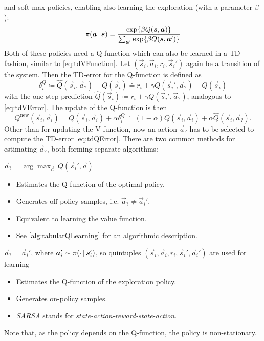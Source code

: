 		and soft-max policies, enabling also learning the exploration (with a parameter \(\beta\)):
		\begin{equation*}
			\pi(\bm{a} \,\vert\, \bm{s}) = \frac{\exp{ \beta Q(\bm{s}, \bm{a}) }}{\sum_{\bm{a}'} \exp{ \beta Q(\bm{s}, \bm{a}') }}
		\end{equation*}
		Both of these policies need a Q-function which can also be learned in a TD-fashion, similar to \eqref{eq:tdVFunction}. Let \( (\vec{s}_i, \vec{a}_i, r_i, \vec{s}_i') \) again be a transition of the system. Then the TD-error for the Q-function is defined as
		\begin{equation}
			\delta_i^Q \coloneqq \hat{Q}(\vec{s}_i, \vec{a}_?) - Q(\vec{s}_i) \doteq r_i + \gamma Q(\vec{s}_i', \vec{a}_?) - Q(\vec{s}_i)  \label{eq:tdQError}
		\end{equation}
		with the one-step prediction \( \hat{Q}(\vec{s}_i) \coloneqq r_i + \gamma Q(\vec{s}_i', \vec{a}_?) \), analogous to \eqref{eq:tdVError}. The update of the Q-function is then
		\begin{equation*}
			Q^\mathrm{new}(\vec{s}_i, \vec{a}_i) = Q(\vec{s}_i, \vec{a}_i) + \alpha \delta_i^Q \doteq (1 - \alpha) Q(\vec{s}_i, \vec{a}_i) + \alpha \hat{Q}(\vec{s}_i, \vec{a}_?).
		\end{equation*}
		Other than for updating the V-function, now an action \( \vec{a}_? \) has to be selected to compute the TD-error \eqref{eq:tdQError}. There are two common methods for estimating \(\vec{a}_?\), both forming separate algorithms:
		\begin{description}[leftmargin=3cm]
			\item[Q-Learning] \( \vec{a}_? = \arg\max_{\vec{a}} \, Q(\vec{s}_i', \vec{a}) \)
				\begin{itemize}
					\item Estimates the Q-function of the optimal policy.
					\item Generates off-policy samples, i.e. \( \vec{a}_? \neq \vec{a}_i' \).
					\item Equivalent to learning the value function.
					\item See \autoref{alg:tabularQLearning} for an algorithmic description.
				\end{itemize}
			\item[SARSA]      \( \vec{a}_? = \vec{a}_i' \), where \( \bm{a}_i' \sim \pi(\cdot \,\vert\, \bm{s}_i') \), so quintuples \( (\vec{s}_i, \vec{a}_i, r_i, \vec{s}_i', \vec{a}_i') \) are used for learning
				\begin{itemize}
					\item Estimates the Q-function of the exploration policy.
					\item Generates on-policy samples.
					\item \emph{SARSA} stands for \emph{state-action-reward-state-action}.
				\end{itemize}
		\end{description}
		Note that, as the policy depends on the Q-function, the policy is non-stationary.

